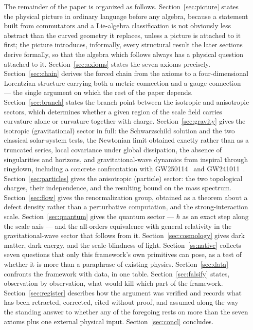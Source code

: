 \documentclass[aps,prd,twocolumn,superscriptaddress,nofootinbib]{revtex4-2}
\begin{document}
The remainder of the paper is organized as follows. Section~\ref{sec:picture}
states the physical picture in ordinary language before any algebra,
because a statement built from commutators and a Lie-algebra
classification is not obviously less abstract than the curved geometry
it replaces, unless a picture is attached to it first; the picture
introduces, informally, every structural result the later sections
derive formally, so that the algebra which follows always has a physical
question attached to it. Section~\ref{sec:axioms} states the seven
axioms precisely. Section~\ref{sec:chain} derives the forced chain from
the axioms to a four-dimensional Lorentzian structure carrying both a
metric connection and a gauge connection — the single argument on which
the rest of the paper depends. Section~\ref{sec:branch} states the
branch point between the isotropic and anisotropic sectors, which
determines whether a given region of the scale field carries curvature
alone or curvature together with charge. Section~\ref{sec:gravity} gives
the isotropic (gravitational) sector in full: the Schwarzschild solution
and the two classical solar-system tests, the Newtonian limit obtained
exactly rather than as a truncated series, local covariance under global
dissipation, the absence of singularities and horizons, and
gravitational-wave dynamics from inspiral through ringdown, including a
concrete confrontation with GW250114~\cite{GW250114} and
GW241011~\cite{GW241011}.
Section~\ref{sec:particles} gives the anisotropic (particle) sector: the
two topological charges, their independence, and the resulting bound on
the mass spectrum. Section~\ref{sec:flow} gives the renormalization
group, obtained as a theorem about a defect density rather than a
perturbative computation, and the strong-interaction scale.
Section~\ref{sec:quantum} gives the quantum sector — $\hbar$ as an exact
step along the scale axis — and the all-orders equivalence with general
relativity in the gravitational-wave sector that follows from it.
Section~\ref{sec:cosmology} gives dark matter, dark energy, and the
scale-blindness of light. Section~\ref{ss:native} collects seven
questions that only this framework's own primitives can pose, as a test
of whether it is more than a paraphrase of existing physics.
Section~\ref{sec:data} confronts the framework
with data, in one table. Section~\ref{sec:falsify} states, observation by
observation, what would kill which part of the framework.
Section~\ref{sec:register} describes how the argument was verified and
records what has been retracted, corrected, cited without proof, and
assumed along the way — the standing answer to whether any of the
foregoing rests on more than the seven axioms plus one external physical
input. Section~\ref{sec:concl} concludes.
\end{document}
